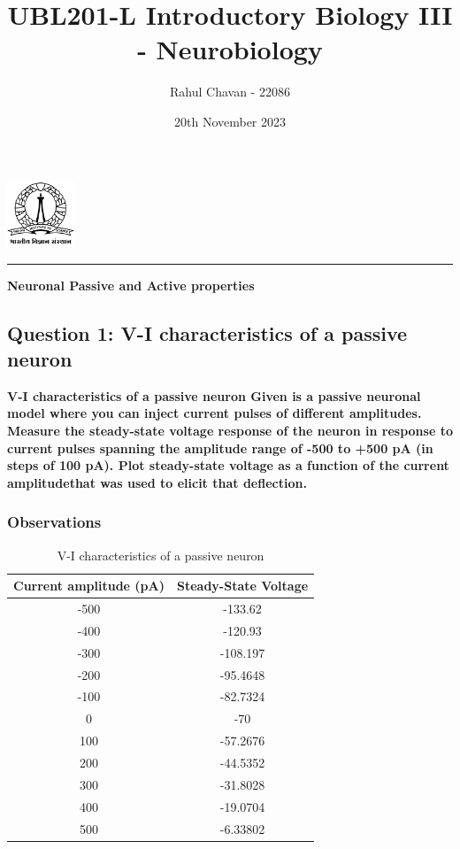 \documentclass{report}
\title{\textbf{UBL201-L Introductory Biology III - Neurobiology}}
\author{Rahul Chavan - 22086}
\date{20th November 2023}
\renewcommand{\maketitle}{
 \begin{center}
    \includegraphics[width=2cm]{IISc_Master_Seal_Black.jpg}
    \vspace{0.5cm}

    \Large
    \textbf{\thetitle}
    
    \vspace{0.5cm}
    
    \Large
    \theauthor
    
    \vspace{0.2cm}
    
    \large
    \thedate

    \vspace{0.5cm}

    \hrule  
    
  \end{center}
}
\begin{document}
\maketitle
\begin{center}
    \Large
    \textbf{Neuronal Passive and Active properties}
\end{center} 


\subsection*{Question 1: V-I characteristics of a passive neuron }

\textbf{V-I characteristics of a passive neuron Given is a passive neuronal model where 
you can inject current pulses of different amplitudes. Measure the steady-state 
voltage response of the neuron in response to current pulses spanning the amplitude range 
of -500 to +500 pA (in steps of 100 pA). Plot steady-state voltage as a function of the 
current amplitudethat was used to elicit that deflection.}

\subsubsection*{Observations}

\begin{table}[!ht]
    \centering
      \caption{V-I characteristics of a passive neuron}
      \vspace{0.5cm}
      \label{tab:table1}
      
      \begin{tabular}{|c|c|}
        \hline
        \textbf{Current amplitude (pA)} & \textbf{Steady-State Voltage} \\
        \hline
        -500 & -133.62 \\
        \hline
        -400 & -120.93 \\
        \hline
        -300 & -108.197 \\
        \hline
        -200 & -95.4648  \\
        \hline
        -100 & -82.7324\\
        \hline
        0 & -70 \\
        \hline
        100 & -57.2676 \\
        \hline
        200 & -44.5352 \\
        \hline
        300 & -31.8028 \\
        \hline
        400 & -19.0704 \\
        \hline
        500 & -6.33802 \\
        \hline
      \end{tabular}
    \end{table}
\end{document}
